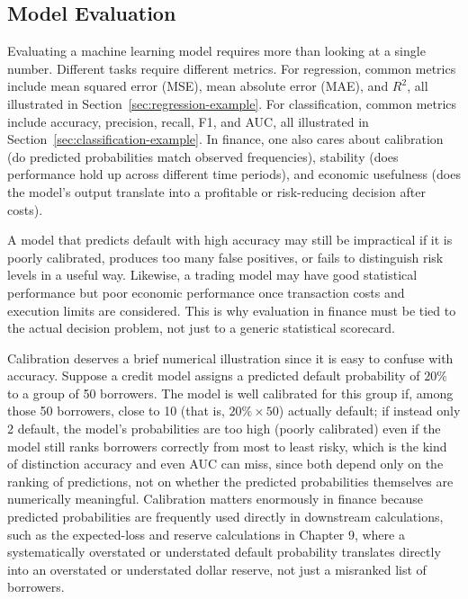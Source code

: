 \documentclass[../ai_in_finance]{subfiles}
\begin{document}
\subsection{Model Evaluation}

Evaluating a machine learning model requires more than looking at a single number. Different tasks require different metrics. For regression, common metrics include mean squared error (MSE), mean absolute error (MAE), and $R^2$, all illustrated in Section~\ref{sec:regression-example}. For classification, common metrics include accuracy, precision, recall, F1, and AUC, all illustrated in Section~\ref{sec:classification-example}. In finance, one also cares about calibration (do predicted probabilities match observed frequencies), stability (does performance hold up across different time periods), and economic usefulness (does the model's output translate into a profitable or risk-reducing decision after costs).

A model that predicts default with high accuracy may still be impractical if it is poorly calibrated, produces too many false positives, or fails to distinguish risk levels in a useful way. Likewise, a trading model may have good statistical performance but poor economic performance once transaction costs and execution limits are considered. This is why evaluation in finance must be tied to the actual decision problem, not just to a generic statistical scorecard.

Calibration deserves a brief numerical illustration since it is easy to confuse with accuracy. Suppose a credit model assigns a predicted default probability of $20\%$ to a group of 50 borrowers. The model is well calibrated for this group if, among those 50 borrowers, close to 10 (that is, $20\% \times 50$) actually default; if instead only 2 default, the model's probabilities are too high (poorly calibrated) even if the model still ranks borrowers correctly from most to least risky, which is the kind of distinction accuracy and even AUC can miss, since both depend only on the ranking of predictions, not on whether the predicted probabilities themselves are numerically meaningful. Calibration matters enormously in finance because predicted probabilities are frequently used directly in downstream calculations, such as the expected-loss and reserve calculations in Chapter 9, where a systematically overstated or understated default probability translates directly into an overstated or understated dollar reserve, not just a misranked list of borrowers.
\end{document}
